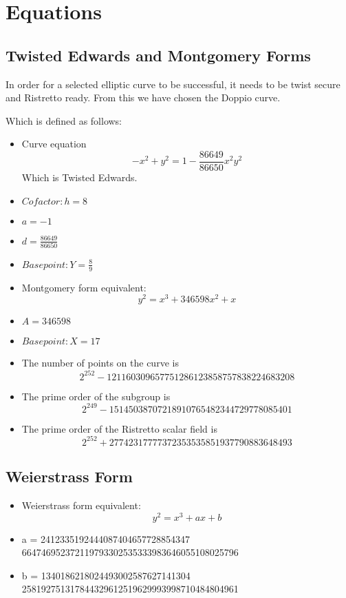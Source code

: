 \documentclass[letterpaper, 10 pt, conference]{ieeeconf}  %
\begin{document}
\section{Equations}
\subsection{Twisted Edwards and Montgomery Forms}
In order for a selected elliptic curve to be successful, it needs to be twist secure and Ristretto ready. From this we have chosen the Doppio curve. 

Which is defined as follows: \begin{itemize}
    \item Curve equation $$ -x^2+y^2=1-\frac{86649}{86650}x^2y^2 $$ Which is Twisted Edwards.
    \item $Cofactor: h = 8$
    \item $a= -1$
    \item $d= \frac{86649}{86650}$
    \item $Basepoint: Y = \frac{8}{9}$\\
    \item Montgomery form equivalent: $$ y^2=x^3+346598x^2+x $$
    \item $A = 346598 $
    \item $Basepoint: X = 17$\\
    \item The number of points on the curve is $$ 2^{252}-121160309657751286123858757838224683208 $$      
    \item The prime order of the subgroup is $$ 2^{249}-15145038707218910765482344729778085401 $$       \item The prime order of the Ristretto scalar field is  $$ 2^{252} + 27742317777372353535851937790883648493 $$
\end{itemize}

\subsection{Weierstrass Form}
\begin{itemize}
    \item Weierstrass form equivalent: \\  $$y^2=x^3+ax+b $$
    \item a = 2412335192444087404657728854347\\664746952372119793302535333983646055108025796
    \item b = 1340186218024493002587627141304\\258192751317844329612519629993998710484804961\\
\end{itemize}
\end{document}
